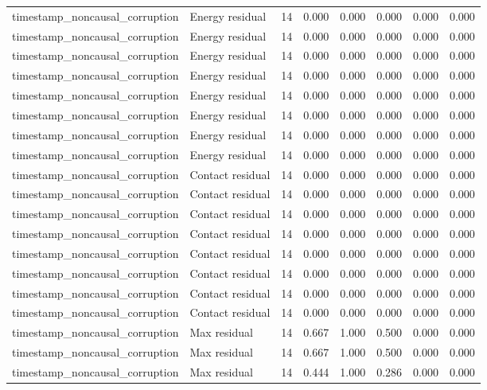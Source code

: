 {\begin{longtable}{llrrrrrr}
timestamp\_noncausal\_corruption & Energy residual & 14 & 0.000 & 0.000 & 0.000 & 0.000 & 0.000 \\
timestamp\_noncausal\_corruption & Energy residual & 14 & 0.000 & 0.000 & 0.000 & 0.000 & 0.000 \\
timestamp\_noncausal\_corruption & Energy residual & 14 & 0.000 & 0.000 & 0.000 & 0.000 & 0.000 \\
timestamp\_noncausal\_corruption & Energy residual & 14 & 0.000 & 0.000 & 0.000 & 0.000 & 0.000 \\
timestamp\_noncausal\_corruption & Energy residual & 14 & 0.000 & 0.000 & 0.000 & 0.000 & 0.000 \\
timestamp\_noncausal\_corruption & Energy residual & 14 & 0.000 & 0.000 & 0.000 & 0.000 & 0.000 \\
timestamp\_noncausal\_corruption & Energy residual & 14 & 0.000 & 0.000 & 0.000 & 0.000 & 0.000 \\
timestamp\_noncausal\_corruption & Energy residual & 14 & 0.000 & 0.000 & 0.000 & 0.000 & 0.000 \\
timestamp\_noncausal\_corruption & Contact residual & 14 & 0.000 & 0.000 & 0.000 & 0.000 & 0.000 \\
timestamp\_noncausal\_corruption & Contact residual & 14 & 0.000 & 0.000 & 0.000 & 0.000 & 0.000 \\
timestamp\_noncausal\_corruption & Contact residual & 14 & 0.000 & 0.000 & 0.000 & 0.000 & 0.000 \\
timestamp\_noncausal\_corruption & Contact residual & 14 & 0.000 & 0.000 & 0.000 & 0.000 & 0.000 \\
timestamp\_noncausal\_corruption & Contact residual & 14 & 0.000 & 0.000 & 0.000 & 0.000 & 0.000 \\
timestamp\_noncausal\_corruption & Contact residual & 14 & 0.000 & 0.000 & 0.000 & 0.000 & 0.000 \\
timestamp\_noncausal\_corruption & Contact residual & 14 & 0.000 & 0.000 & 0.000 & 0.000 & 0.000 \\
timestamp\_noncausal\_corruption & Contact residual & 14 & 0.000 & 0.000 & 0.000 & 0.000 & 0.000 \\
timestamp\_noncausal\_corruption & Max residual & 14 & 0.667 & 1.000 & 0.500 & 0.000 & 0.000 \\
timestamp\_noncausal\_corruption & Max residual & 14 & 0.667 & 1.000 & 0.500 & 0.000 & 0.000 \\
timestamp\_noncausal\_corruption & Max residual & 14 & 0.444 & 1.000 & 0.286 & 0.000 & 0.000 \\

\end{longtable}}
